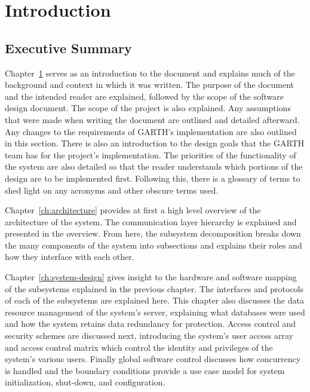\documentclass{report}
\begin{document}

\tableofcontents
\listoffigures
\listoftables
\chapter{Introduction} %
\label{ch:introduction}

\section{Executive Summary}

Chapter~\ref{ch:introduction} serves as an introduction to the document and
explains much of the background and context in which it was written. The
purpose of the document and the intended reader are explained, followed by the
scope of the software design document. The scope of the project is also
explained. Any assumptions that were made when writing the document are
outlined and detailed afterward. Any changes to the requirements of GARTH's
implementation are also outlined in this section. There is also an introduction
to the design goals that the GARTH team has for the project's implementation.
The priorities of the functionality of the system are also detailed so that the
reader understands which portions of the design are to be implemented first.
Following this, there is a glossary of terms to shed light on any acronyms and
other obscure terms used.

Chapter~\ref{ch:architecture} provides at first a high level overview of the
architecture of the system. The communication layer hierarchy is explained and
presented in the overview. From here, the subsystem decomposition breaks down
the many components of the system into subsections and explains their roles and
how they interface with each other.

Chapter~\ref{ch:system-design} gives insight to the hardware and software
mapping of the subsystems explained in the previous chapter. The interfaces and
protocols of each of the subsystems are explained here. This chapter also
discusses the data resource management of the system's server, explaining what
databases were used and how the system retains data redundancy for protection.
Access control and security schemes are discussed next, introducing the
system's user access array and access control matrix which control the identity
and privileges of the system's various users. Finally global software control
discusses how concurrency is handled and the boundary conditions provide a use
case model for system initialization, shut-down, and configuration.
\end{document}
